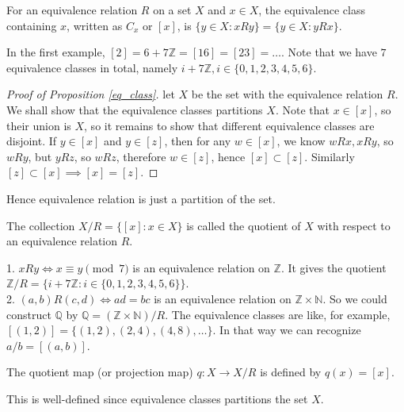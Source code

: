 \begin{definition}
    For an equivalence relation $R$ on a set $X$ and $x\in X$, the equivalence class containing $x$, written as $C_x$ or $[x]$, is $\{y\in X:xRy\}=\{y\in X:yRx\}$.
\end{definition}
\begin{example}
    In the first example, $[2]=6+7\mathbb Z=[16]=[23]=\ldots$.
    Note that we have $7$ equivalence classes in total, namely $i+7\mathbb Z,i\in\{0,1,2,3,4,5,6\}$.
\end{example}
\begin{proof}[Proof of Proposition \ref{eq_class}]
    let $X$ be the set with the equivalence relation $R$.
    We shall show that the equivalence classes partitions $X$.
    Note that $x\in [x]$, so their union is $X$, so it remains to show that different equivalence classes are disjoint.
    If $y\in [x]$ and $y\in [z]$, then for any $w\in [x]$, we know $wRx,xRy$, so $wRy$, but $yRz$, so $wRz$, therefore $w\in [z]$, hence $[x]\subset [z]$.
    Similarly $[z]\subset [x]\implies [x]=[z]$.
\end{proof}
Hence equivalence relation is just a partition of the set.
\begin{definition}
    The collection $X/R=\{[x]:x\in X\}$ is called the quotient of $X$ with respect to an equivalence relation $R$.
\end{definition}
\begin{example}
    1. $xRy\iff x\equiv y\pmod{7}$ is an equivalence relation on $\mathbb Z$.
    It gives the quotient $\mathbb Z/R=\{i+7\mathbb Z:i\in \{0,1,2,3,4,5,6\}\}$.\\
    2. $(a,b)R(c,d)\iff ad=bc$ is an equivalence relation on $\mathbb Z\times\mathbb N$.
    So we could construct $\mathbb Q$ by $\mathbb Q=(\mathbb Z\times\mathbb N)/R$.
    The equivalence classes are like, for example, $[(1,2)]=\{(1,2),(2,4),(4,8),\ldots\}$.
    In that way we can recognize $a/b=[(a,b)]$.
\end{example}
\begin{definition}
    The quotient map (or projection map) $q:X\to X/R$ is defined by $q(x)=[x]$.
\end{definition}
This is well-defined since equivalence classes partitions the set $X$.
